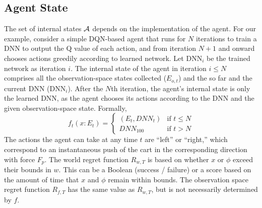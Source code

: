 \subsection{Agent State}
The set of internal states ${\cal A}$ depends on the implementation of the agent. For our example, consider a simple DQN-based agent that runs for $N$ iterations to train a DNN to output the Q value of each action, 
and from iteration $N+1$ and onward chooses actions greedily according to learned network. 
Let DNN$_i$ be the trained network as iteration $i$. 
The internal state of the agent in iteration $i\leq N$ comprises all the observation-space states collected ($E_{o,t}$) and the so far and the current DNN (DNN$_i$). 
After the $N$th iteration, the agent's internal state is only the learned DNN, as the agent chooses its actions according to the DNN and the given observation-space state.   Formally, 
\begin{equation}
f_t(x : E_t) = 
\begin{cases}
(E_t, DNN_t) & \text{if $t\leq N$} \\
DNN_{100} & \text{if $t> N$} 
  \end{cases}
\end{equation}
The actions the agent can take at any time $t$ are ``left'' or ``right,'' which correspond to an instantaneous push of the cart in the corresponding direction with force $F_p$.
The world regret function $R_{w,T}$ is based on whether $x$ or $\phi$ exceed their bounds in $w$. This can be a Boolean (success / failure) or a score based on the amount of time that $x$ and $\phi$ remain within bounds. The observation space regret function $R_{f,T}$ has the same value as $R_{w,T}$, but is not necessarily determined by $f$. %
\fi




